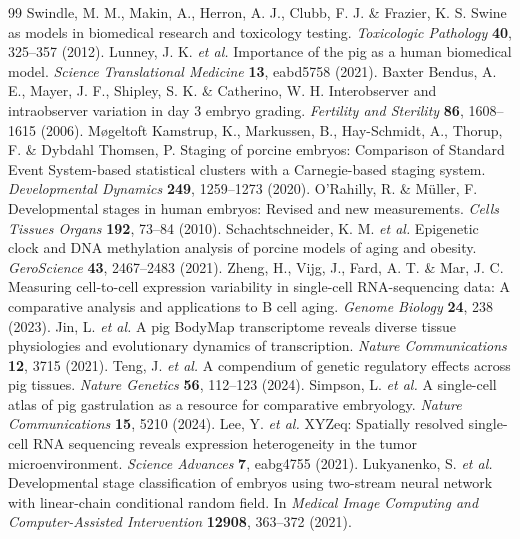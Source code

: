 \documentclass[11pt]{article}
\begin{document}
\begin{thebibliography}{99}
 Swindle, M. M., Makin, A., Herron, A. J., Clubb, F. J. \& Frazier, K. S. Swine as models in biomedical research and toxicology testing. \textit{Toxicologic Pathology} \textbf{40}, 325--357 (2012).
 Lunney, J. K. \textit{et al.} Importance of the pig as a human biomedical model. \textit{Science Translational Medicine} \textbf{13}, eabd5758 (2021).
 Baxter Bendus, A. E., Mayer, J. F., Shipley, S. K. \& Catherino, W. H. Interobserver and intraobserver variation in day 3 embryo grading. \textit{Fertility and Sterility} \textbf{86}, 1608--1615 (2006).
 M{\o}geltoft Kamstrup, K., Markussen, B., Hay-Schmidt, A., Thorup, F. \& Dybdahl Thomsen, P. Staging of porcine embryos: Comparison of Standard Event System-based statistical clusters with a Carnegie-based staging system. \textit{Developmental Dynamics} \textbf{249}, 1259--1273 (2020).
 O'Rahilly, R. \& M{\"u}ller, F. Developmental stages in human embryos: Revised and new measurements. \textit{Cells Tissues Organs} \textbf{192}, 73--84 (2010).
 Schachtschneider, K. M. \textit{et al.} Epigenetic clock and DNA methylation analysis of porcine models of aging and obesity. \textit{GeroScience} \textbf{43}, 2467--2483 (2021).
 Zheng, H., Vijg, J., Fard, A. T. \& Mar, J. C. Measuring cell-to-cell expression variability in single-cell RNA-sequencing data: A comparative analysis and applications to B cell aging. \textit{Genome Biology} \textbf{24}, 238 (2023).
 Jin, L. \textit{et al.} A pig BodyMap transcriptome reveals diverse tissue physiologies and evolutionary dynamics of transcription. \textit{Nature Communications} \textbf{12}, 3715 (2021).
 Teng, J. \textit{et al.} A compendium of genetic regulatory effects across pig tissues. \textit{Nature Genetics} \textbf{56}, 112--123 (2024).
 Simpson, L. \textit{et al.} A single-cell atlas of pig gastrulation as a resource for comparative embryology. \textit{Nature Communications} \textbf{15}, 5210 (2024).
 Lee, Y. \textit{et al.} XYZeq: Spatially resolved single-cell RNA sequencing reveals expression heterogeneity in the tumor microenvironment. \textit{Science Advances} \textbf{7}, eabg4755 (2021).
 Lukyanenko, S. \textit{et al.} Developmental stage classification of embryos using two-stream neural network with linear-chain conditional random field. In \textit{Medical Image Computing and Computer-Assisted Intervention} \textbf{12908}, 363--372 (2021).
\end{thebibliography}
\end{document}
